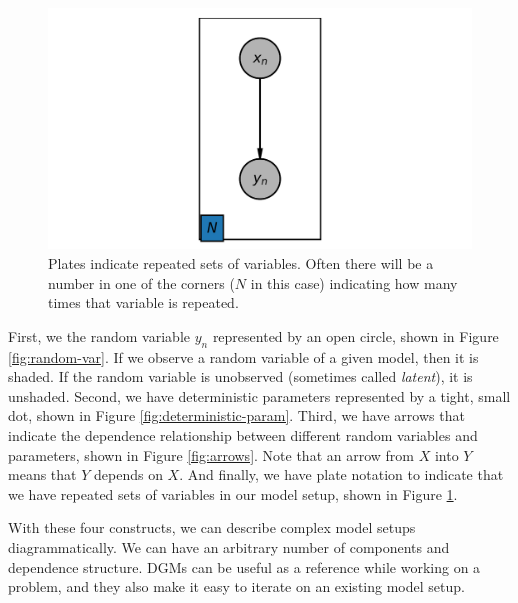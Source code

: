 \begin{figure}[H]
    \centering
    \includegraphics[width=0.5\paperwidth]{../GraphicalModels/fig/plates.png}
    \caption{Plates indicate repeated sets of variables. Often there will be a number in one of the corners ($N$ in this case) indicating how many times that variable is repeated.}
    \label{fig:plates}
\end{figure}

First, we the random variable $y_n$ represented by an open circle, shown in Figure \ref{fig:random-var}. If we observe a random variable of a given model, then it is shaded. If the random variable is unobserved (sometimes called \textit{latent}), it is unshaded. Second, we have deterministic parameters represented by a tight, small dot, shown in Figure \ref{fig:deterministic-param}. Third, we have arrows that indicate the dependence relationship between different random variables and parameters, shown in Figure \ref{fig:arrows}. Note that an arrow from $X$ into $Y$ means that $Y$ depends on $X$. And finally, we have plate notation to indicate that we have repeated sets of variables in our model setup, shown in Figure \ref{fig:plates}.

With these four constructs, we can describe complex model setups diagrammatically. We can have an arbitrary number of components and dependence structure. DGMs can be useful as a reference while working on a problem, and they also make it easy to iterate on an existing model setup.


